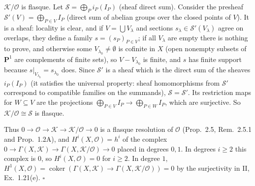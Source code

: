 \documentclass[11pt]{article}
\begin{document}
$\mathcal K/\mathcal O$ is flasque. Let $\mathcal S=\bigoplus_Pi_P(I_P)$ (sheaf direct sum). Consider the presheaf $\mathcal S'(V)=\bigoplus_{P\in V}I_P$ (direct sum of abelian groups over the closed points of $V$). It is a sheaf: locality is clear, and if $V=\bigcup V_\lambda$ and sections $s_\lambda\in\mathcal S'(V_\lambda)$ agree on overlaps, they define a family $s=(s_P)_{P\in V}$; if all $V_\lambda$ are empty there is nothing to prove, and otherwise some $V_{\lambda_0}\neq\emptyset$ is cofinite in $X$ (open nonempty subsets of $\mathbf P^1$ are complements of finite sets), so $V-V_{\lambda_0}$ is finite, and $s$ has finite support because $s|_{V_{\lambda_0}}=s_{\lambda_0}$ does. Since $\mathcal S'$ is a sheaf which is the direct sum of the sheaves $i_P(I_P)$ (it satisfies the universal property: sheaf homomorphisms from $\mathcal S'$ correspond to compatible families on the summands), $\mathcal S=\mathcal S'$. Its restriction maps for $W\subseteq V$ are the projections $\bigoplus_{P\in V}I_P\to\bigoplus_{P\in W}I_P$, which are surjective. So $\mathcal K/\mathcal O\cong\mathcal S$ is flasque.

Thus $0\to\mathcal O\to\mathcal K\to\mathcal K/\mathcal O\to0$ is a flasque resolution of $\mathcal O$ (Prop.~2.5, Rem.~2.5.1 and Prop.~1.2A), and $H^i(X,\mathcal O)=h^i$ of the complex $0\to\Gamma(X,\mathcal K)\to\Gamma(X,\mathcal K/\mathcal O)\to0$ placed in degrees $0,1$. In degrees $i\ge2$ this complex is $0$, so $H^i(X,\mathcal O)=0$ for $i\ge2$. In degree $1$, $H^1(X,\mathcal O)=\operatorname{coker}(\Gamma(X,\mathcal K)\to\Gamma(X,\mathcal K/\mathcal O))=0$ by the surjectivity in II, Ex.~1.21(e). \hfill$\square$
\end{document}

